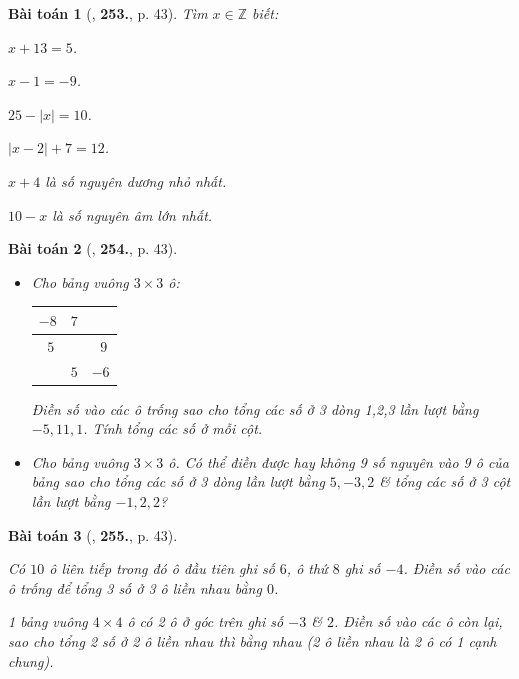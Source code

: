 \documentclass{article}
\numberwithin{equation}{section}
\newtheorem{baitoan}{Bài toán}
\begin{document}
\begin{baitoan}[\cite{Binh_Toan_6_tap_1}, \textbf{253.}, p. 43]
	Tìm $x\in\mathbb{Z}$ biết:
	\begin{enumerate*}
		\item[(a)] $x + 13 = 5$.
		\item[(b)] $x - 1 = -9$.
		\item[(c)] $25 - |x| = 10$.
		\item[(d)] $|x - 2| + 7 = 12$.
		\item[(e)] $x + 4$ là số nguyên dương nhỏ nhất.
		\item[(f)] $10 - x$ là số nguyên âm lớn nhất.
	\end{enumerate*}
\end{baitoan}

\begin{baitoan}[\cite{Binh_Toan_6_tap_1}, \textbf{254.}, p. 43]
	\begin{itemize}
		\item[(a)] Cho bảng vuông $3\times 3$ ô:
		\begin{table}[H]
			\centering
			\begin{tabular}{|c|c|c|}
				\hline
				$-8$ & $7$ &  \\
				\hline
				$\ \ 5$ &  & $\ \ 9$ \\
				\hline
				& $5$ & $-6$ \\
				\hline
			\end{tabular}
		\end{table}
		Điền số vào các ô trống sao cho tổng các số ở 3 dòng 1,2,3 lần lượt bằng $-5,11,1$. Tính tổng các số ở mỗi cột.
		\item[(b)] Cho bảng vuông $3\times 3$ ô. Có thể điền được hay không 9 số nguyên vào 9 ô của bảng sao cho tổng các số ở 3 dòng lần lượt bằng $5,-3,2$ \& tổng các số ở 3 cột lần lượt bằng $-1,2,2$?
	\end{itemize}
\end{baitoan}

\begin{baitoan}[\cite{Binh_Toan_6_tap_1}, \textbf{255.}, p. 43]
	\begin{enumerate*}
		\item[(a)] Có $10$ ô liên tiếp trong đó ô đầu tiên ghi số $6$, ô thứ $8$ ghi số $-4$. Điền số vào các ô trống để tổng 3 số ở 3 ô liền nhau bằng $0$.
		\item[(b)] 1 bảng vuông $4\times 4$ ô có 2 ô ở góc trên ghi số $-3$ \& $2$. Điền số vào các ô còn lại, sao cho tổng 2 số ở 2 ô liền nhau thì bằng nhau (2 ô liền nhau là 2 ô có 1 cạnh chung).
	\end{enumerate*}
\end{baitoan}
\end{document}
